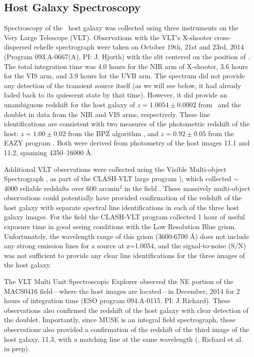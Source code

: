 \subsection{Host Galaxy Spectroscopy}\label{sec:Spectroscopy}

Spectroscopy of the \spock\ host galaxy was collected using three
instruments on the Very Large Telescope (VLT).  Observations with the
VLT's X-shooter cross-dispersed echelle spectrograph
\citep{Vernet:2011} were taken on October 19th, 21st and 23rd, 2014
(Program 093.A-0667(A), PI: J. Hjorth) with the slit centered on the
position of \spocktwo.  The total integration time was 4.0 hours for
the NIR arm of X-shooter, 3.6 hours for the VIS arm, and 3.9 hours for
the UVB arm.  The spectrum did not provide any detection of the
transient source itself (as we will see below, it had already faded
back to its quiescent state by that time).  However, it did provide an
unambiguous redshift for the host galaxy of $z=1.0054\pm0.0002$ from
\Ha\ and the  doublet in data from the NIR and VIS
arms, respectively.  These line identifications are consistent with
two measures of the photometric redshift of the host: $z=1.00\pm0.02$
from the BPZ algorithm \citep{Benitez:2000}, and $z=0.92\pm0.05$ from
the EAZY program \citep{Brammer:2008}.  Both were derived from \HST
photometry of the host images 11.1 and 11.2, spanning 4350--16000 \AA.

Additional VLT observations were collected using the Visible
Multi-object Spectrograph \citep[VIMOS][]{LeFevre:2003}, as part of
the CLASH-VLT large program \citep[Program 186.A-0.798; P.I.:
  P. Rosati;][]{Rosati:2014}), which collected $\sim$4000 reliable
redshifts over 600 arcmin$^2$ in the  field
\citep{Grillo:2015,Balestra:2016}.  These massively multi-object
observations could potentially have provided confirmation of the
redshift of the \spock host galaxy with separate spectral line
identifications in each of the three host galaxy images.  For the
 field the CLASH-VLT program collected 1 hour of useful
exposure time in good seeing conditions with the Low Resolution Blue
grism.  Unfortunately, the wavelength range of this grism (3600-6700
\AA) does not include any strong emission lines for a source at
z=1.0054, and the signal-to-noise (S/N) was not sufficient to provide
any clear line identifications for the three images of the \spock host
galaxy.

The VLT Multi Unit Spectroscopic Explorer
\citep[MUSE;][]{Henault:2003,Bacon:2012} observed the NE portion of
the MACS0416 field---where the \spock host images are located---in
December, 2014 for 2 hours of integration time (ESO program
094.A-0115, PI: J.\,Richard).  These observations also confirmed the
redshift of the host galaxy with clear detection of the
 doublet.  Importantly, since MUSE is an integral
field spectrograph, these observations also provided a confirmation of
the redshift of the third image of the host galaxy, 11.3, with a
matching  line at the same wavelength
(\citealt{Caminha:2017}, Richard et al. in prep).

